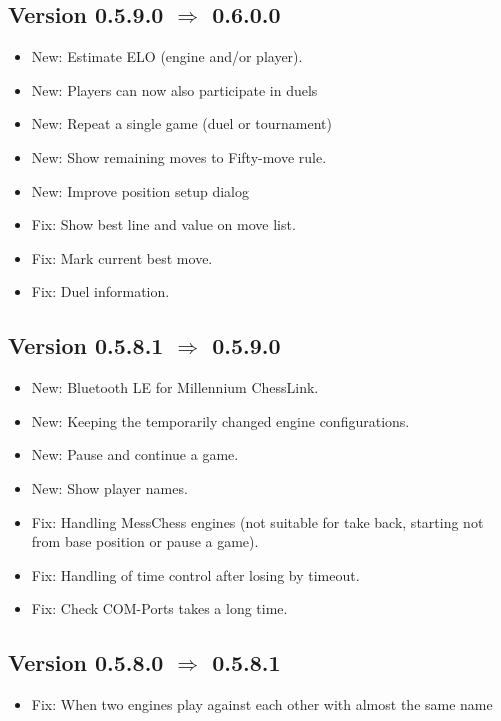 \documentclass[11pt,a4paper]{article}
\begin{document}
\subsection*{Version 0.5.9.0 $\Rightarrow$  0.6.0.0}
\begin{itemize}
		\item New: Estimate ELO (engine and/or player).
		\item New: Players can now also participate in duels		
		\item New: Repeat a single game (duel or tournament)
		\item New: Show remaining moves to Fifty-move rule.		
		\item New: Improve position setup dialog		
		\item Fix: Show best line and value on move list.
		\item Fix: Mark current best move.
		\item Fix: Duel information.		
\end{itemize}

\subsection*{Version 0.5.8.1 $\Rightarrow$  0.5.9.0}
\begin{itemize}
	\item New: Bluetooth LE for Millennium ChessLink.
	\item New: Keeping the temporarily changed engine configurations.
	\item New: Pause and continue a game.	
	\item New: Show player names.	
	\item Fix: Handling MessChess engines (not suitable for take back, starting not from base position or pause a game).
	\item Fix: Handling of time control after losing by timeout.
	\item Fix: Check COM-Ports takes a long time.
\end{itemize}

\subsection*{Version 0.5.8.0 $\Rightarrow$  0.5.8.1}
\begin{itemize}
	\item Fix: When two engines play against each other with almost the same name
\end{itemize}
\end{document}
